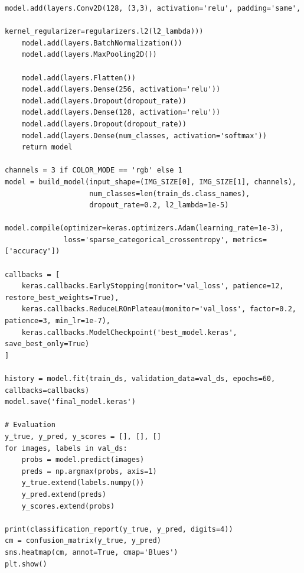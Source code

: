 \documentclass[conference]{IEEEtran}
\begin{document}
\begin{lstlisting}[caption={Core training & evaluation script (Python)}]
    model.add(layers.Conv2D(128, (3,3), activation='relu', padding='same',
                            kernel_regularizer=regularizers.l2(l2_lambda)))
    model.add(layers.BatchNormalization())
    model.add(layers.MaxPooling2D())

    model.add(layers.Flatten())
    model.add(layers.Dense(256, activation='relu'))
    model.add(layers.Dropout(dropout_rate))
    model.add(layers.Dense(128, activation='relu'))
    model.add(layers.Dropout(dropout_rate))
    model.add(layers.Dense(num_classes, activation='softmax'))
    return model

channels = 3 if COLOR_MODE == 'rgb' else 1
model = build_model(input_shape=(IMG_SIZE[0], IMG_SIZE[1], channels),
                    num_classes=len(train_ds.class_names),
                    dropout_rate=0.2, l2_lambda=1e-5)

model.compile(optimizer=keras.optimizers.Adam(learning_rate=1e-3),
              loss='sparse_categorical_crossentropy', metrics=['accuracy'])

callbacks = [
    keras.callbacks.EarlyStopping(monitor='val_loss', patience=12, restore_best_weights=True),
    keras.callbacks.ReduceLROnPlateau(monitor='val_loss', factor=0.2, patience=3, min_lr=1e-7),
    keras.callbacks.ModelCheckpoint('best_model.keras', save_best_only=True)
]

history = model.fit(train_ds, validation_data=val_ds, epochs=60, callbacks=callbacks)
model.save('final_model.keras')

# Evaluation
y_true, y_pred, y_scores = [], [], []
for images, labels in val_ds:
    probs = model.predict(images)
    preds = np.argmax(probs, axis=1)
    y_true.extend(labels.numpy())
    y_pred.extend(preds)
    y_scores.extend(probs)

print(classification_report(y_true, y_pred, digits=4))
cm = confusion_matrix(y_true, y_pred)
sns.heatmap(cm, annot=True, cmap='Blues')
plt.show()
\end{lstlisting}
\end{document}
